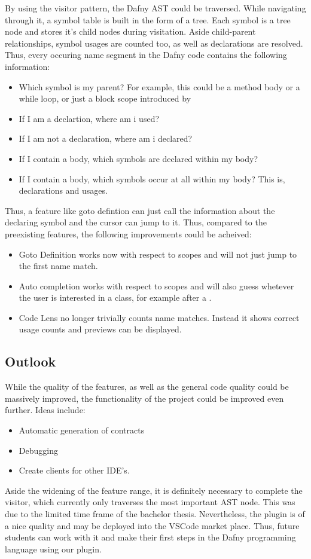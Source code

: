 By using the visitor pattern, the Dafny AST could be traversed.
While navigating through it, a symbol table is built in the form of a tree.
Each symbol is a tree node and stores it's child nodes during visitation.
Aside child-parent relationships, symbol usages are counted too, as well as declarations are resolved.
Thus, every occuring name segment in the Dafny code contains the following information:
\begin{itemize}
    \item Which symbol is my parent? For example, this could be a method body or a while loop, or just a block scope introduced by \code{\string{$\ddots$\string}}
    \item If I am a declartion, where am i used?
    \item If I am not a declaration, where am i declared?
    \item If I contain a body, which symbols are declared within my body?
    \item If I contain a body, which symbols occur at all within my body? This is, declarations and usages.
\end{itemize}
Thus, a feature like goto defintion can just call the information about the declaring symbol and the cursor can jump to it.
Thus, compared to the preexisting features, the following improvements could be acheived:
\begin{itemize}
    \item Goto Definition works now with respect to scopes and will not just jump to the first name match.
    \item Auto completion works with respect to scopes and will also guess whetever the user is interested in a class, for example after a .
    \item Code Lens no longer trivially counts name matches.
    Instead it shows correct usage counts and previews can be displayed.
\end{itemize}



\subsection{Outlook}
While the quality of the features, as well as the general code quality could be massively improved, the functionality of the project could be improved even further.
Ideas include:
\begin{itemize}
    \item Automatic generation of contracts
    \item Debugging
    \item Create clients for other IDE's.
\end{itemize}
Aside the widening of the feature range, it is definitely necessary to complete the visitor, which currently only traverses the most important AST node.
This was due to the limited time frame of the bachelor thesis.
Nevertheless, the plugin is of a nice quality and may be deployed into the VSCode market place.
Thus, future students can work with it and make their first steps in the Dafny programming language using our plugin.








